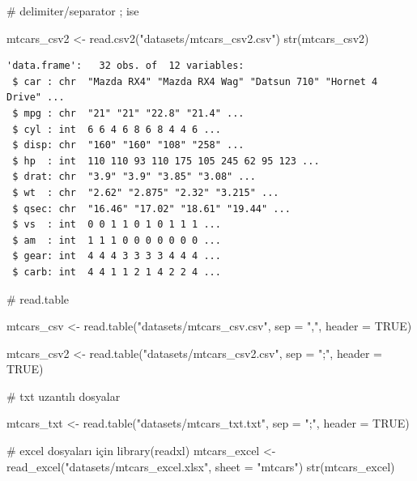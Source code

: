 \documentclass[
  letterpaper,
  DIV=11,
  numbers=noendperiod]{scrreprt}
\newenvironment{Shaded}{\begin{snugshade}}{\end{snugshade}}
\newcommand{\AttributeTok}[1]{\textcolor[rgb]{0.40,0.45,0.13}{#1}}
\newcommand{\CommentTok}[1]{\textcolor[rgb]{0.37,0.37,0.37}{#1}}
\newcommand{\ConstantTok}[1]{\textcolor[rgb]{0.56,0.35,0.01}{#1}}
\newcommand{\FunctionTok}[1]{\textcolor[rgb]{0.28,0.35,0.67}{#1}}
\newcommand{\NormalTok}[1]{\textcolor[rgb]{0.00,0.23,0.31}{#1}}
\newcommand{\OtherTok}[1]{\textcolor[rgb]{0.00,0.23,0.31}{#1}}
\newcommand{\StringTok}[1]{\textcolor[rgb]{0.13,0.47,0.30}{#1}}
\begin{document}
\begin{Shaded}
\begin{Highlighting}[]
\CommentTok{\# delimiter/separator ; ise}

\NormalTok{mtcars\_csv2 }\OtherTok{\textless{}{-}} \FunctionTok{read.csv2}\NormalTok{(}\StringTok{"datasets/mtcars\_csv2.csv"}\NormalTok{)}
\FunctionTok{str}\NormalTok{(mtcars\_csv2)}
\end{Highlighting}
\end{Shaded}

\begin{verbatim}
'data.frame':   32 obs. of  12 variables:
 $ car : chr  "Mazda RX4" "Mazda RX4 Wag" "Datsun 710" "Hornet 4 Drive" ...
 $ mpg : chr  "21" "21" "22.8" "21.4" ...
 $ cyl : int  6 6 4 6 8 6 8 4 4 6 ...
 $ disp: chr  "160" "160" "108" "258" ...
 $ hp  : int  110 110 93 110 175 105 245 62 95 123 ...
 $ drat: chr  "3.9" "3.9" "3.85" "3.08" ...
 $ wt  : chr  "2.62" "2.875" "2.32" "3.215" ...
 $ qsec: chr  "16.46" "17.02" "18.61" "19.44" ...
 $ vs  : int  0 0 1 1 0 1 0 1 1 1 ...
 $ am  : int  1 1 1 0 0 0 0 0 0 0 ...
 $ gear: int  4 4 4 3 3 3 3 4 4 4 ...
 $ carb: int  4 4 1 1 2 1 4 2 2 4 ...
\end{verbatim}

\begin{Shaded}
\begin{Highlighting}[]
\CommentTok{\# read.table}

\NormalTok{mtcars\_csv }\OtherTok{\textless{}{-}} \FunctionTok{read.table}\NormalTok{(}\StringTok{"datasets/mtcars\_csv.csv"}\NormalTok{,}
                         \AttributeTok{sep =} \StringTok{","}\NormalTok{,}
                         \AttributeTok{header =} \ConstantTok{TRUE}\NormalTok{)}

\NormalTok{mtcars\_csv2 }\OtherTok{\textless{}{-}} \FunctionTok{read.table}\NormalTok{(}\StringTok{"datasets/mtcars\_csv2.csv"}\NormalTok{,}
                          \AttributeTok{sep =} \StringTok{";"}\NormalTok{,}
                          \AttributeTok{header =} \ConstantTok{TRUE}\NormalTok{)}

\CommentTok{\# txt uzantılı dosyalar}

\NormalTok{mtcars\_txt }\OtherTok{\textless{}{-}} \FunctionTok{read.table}\NormalTok{(}\StringTok{"datasets/mtcars\_txt.txt"}\NormalTok{,}
                          \AttributeTok{sep =} \StringTok{";"}\NormalTok{,}
                          \AttributeTok{header =} \ConstantTok{TRUE}\NormalTok{)}

\CommentTok{\# excel dosyaları için}
\FunctionTok{library}\NormalTok{(readxl)}
\NormalTok{mtcars\_excel }\OtherTok{\textless{}{-}} \FunctionTok{read\_excel}\NormalTok{(}\StringTok{"datasets/mtcars\_excel.xlsx"}\NormalTok{,}
                           \AttributeTok{sheet =} \StringTok{"mtcars"}\NormalTok{)}
\FunctionTok{str}\NormalTok{(mtcars\_excel)}
\end{Highlighting}
\end{Shaded}
\end{document}
